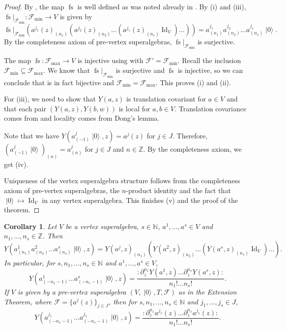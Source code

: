 \documentclass[a4paper, 12pt, reqno]{amsart}
\newtheorem{corollary}[theorem]{Corollary}
\theoremstyle{remark}
\numberwithin{equation}{subsection}
\DeclareMathOperator{\Id}{Id}
\DeclareMathOperator{\vac}{|0\rangle}
\DeclareMathOperator{\fs}{fs}
\begin{document}
\begin{proof}
  By , the map $\fs$ is well defined as was noted already in .
  By (i) and (iii), $\fs|_{\mathcal{F}_{\min}}: \mathcal{F}_{\min} \to V$ is given by
  \begin{equation*}
    \fs|_{\mathcal{F}_{\min}}(a^{j_1}(z)_{(n_1)}(a^{j_2}(z)_{(n_2)}\dots (a^{j_s}(z)_{(n_s)}\Id_V)\dots)) = a^{j_1}_{(n_1)}a^{j_2}_{(n_2)}\dots a^{j_s}_{(n_s)}\vac.
  \end{equation*}
  By the completeness axiom of pre-vertex superalgebras, $\fs|_{\mathcal{F}_{\min}}$ is surjective.

  The map $\fs: \mathcal{F}_{\max} \to V$ is injective using  with $\mathcal{F}' = \mathcal{F}_{\min}$.
  Recall the inclusion $\mathcal{F}_{\min} \subseteq \mathcal{F}_{\max}$.
  We know that $\fs|_{\mathcal{F}_{\min}}$ is surjective and $\fs$ is injective, so we can conclude that is in fact bijective and $\mathcal{F}_{\min} = \mathcal{F}_{\max}$.
  This proves (i) and (ii).

  For (iii), we need to show that $Y(a, z)$ is translation covariant for $a \in V$ and that each pair $(Y(a, z), Y(b, w))$ is local for $a, b \in V$.
  Translation covariance comes from  and locality comes from Dong's lemma.

  Note that we have $Y(a^j_{(-1)}\vac, z) = a^j(z)$ for $j \in J$.
  Therefore, $(a^j_{(-1)}\vac)_{(n)} = a^j_{(n)}$ for $j \in J$ and $n \in \mathbb{Z}$.
  By the completeness axiom, we get (iv).

  Uniqueness of the vertex superalgebra structure follows from the completeness axiom of pre-vertex superalgebras, the $n$-product identity and the fact that $\vac \mapsto \Id_V$ in any vertex superalgebra.
  This finishes (v) and the proof of the theorem.
\end{proof}

\begin{corollary}
  \label{crl:1}
  Let $V$ be a vertex superalgebra, $s \in \mathbb{N}$, $a^1, \dots, a^s \in V$ and $n_1, \dots, n_s \in \mathbb{Z}$.
  Then
  \begin{equation*}
    Y(a^1_{(n_1)}a^2_{(n_2)}\dots a^s_{(n_s)}\vac, z) = Y(a^j, z)_{(n_1)}(Y(a^2, z)_{(n_2)}\dots (Y(a^s, z)_{(n_s)}\Id_V)\dots).
  \end{equation*}
  In particular, for $s, n_1, \dots, n_s \in \mathbb{N}$ and $a^1, \dots, a^s \in V$,
  \begin{equation*}
    Y(a^1_{(-n_1 - 1)}\dots a^s_{(-n_s - 1)}\vac, z) = \frac{:\partial^{n_1}_zY(a^1, z)\dots \partial^{n_s}_zY(a^s, z):}{n_1!\dots n_s!}.
  \end{equation*}
  If $V$ is given by a pre-vertex superalgebra $(V, \vac, T, \mathcal{F})$ as in the Extension Theorem, where $\mathcal{F} = \{a^j(z)\}_{j \in J}$, then for $s, n_1, \dots, n_s \in \mathbb{N}$ and $j_1, \dots, j_s \in J$,
  \begin{equation*}
    Y(a^{j_1}_{(-n_1 - 1)}\dots a^{j_s}_{(-n_s - 1)}\vac, z) = \frac{:\partial^{n_1}_za^{j_1}(z)\dots \partial^{n_s}_za^{j_s}(z):}{n_1!\dots n_s!}.
  \end{equation*}
\end{corollary}
\end{document}
